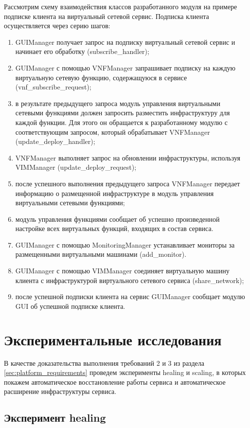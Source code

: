 \documentclass[oneside,final,14pt,a4paper]{extreport}
\begin{document}
Рассмотрим схему взаимодействия классов разработанного модуля на примере подписке клиента на виртуальный сетевой сервис. Подписка клиента осуществляется через серию шагов:
\begin{enumerate}
	\item GUIManager получает запрос на подписку виртуальный сетевой сервис и начинает его обработку (subscribe\_handler);
	\item GUIManager с помощью VNFManager запрашивает подписку на каждую виртуальную сетевую функцию, содержащуюся в сервисе (vnf\_subscribe\_request);
	\item в результате предыдущего запроса модуль управления виртуальными сетевыми функциями должен запросить разместить инфраструктуру для каждой функции. Для этого он обращается к разработанному модулю с соответствующим запросом, который обрабатывает VNFManager (update\_deploy\_handler);
	\item VNFManager выполняет запрос на обновлении инфраструктуры, используя VIMManager (update\_deploy\_request);
	\item после успешного выполнения предыдущего запроса VNFManager передает информацию о размещенной инфраструктуре в модуль управления виртуальными сетевыми функциями;
	\item модуль управления функциями сообщает об успешно произведенной настройке всех виртуальных функций, входящих в состав сервиса.
	\item GUIManager с помощью MonitoringManager устанавливает мониторы за размещенными виртуальными машинами (add\_monitor). 
	\item GUIManager с помощью VIMManager соединяет виртуальную машину клиента с инфраструктурой виртуального сетевого сервиса (share\_network);
	\item после успешной подписки клиента на сервис GUIManager сообщает модулю GUI об успешной подписке клиента.
\end{enumerate}




\chapter{Экспериментальные исследования}
\label{chap:expirements}
В качестве доказательства выполнения требований 2 и 3 из раздела \ref{sec:platform_requirements} проведем эксперименты healing и scaling, в которых покажем автоматическое восстановление работы сервиса и автоматическое расширение инфраструктуры сервиса.

\section{Эксперимент healing}
\end{document}
